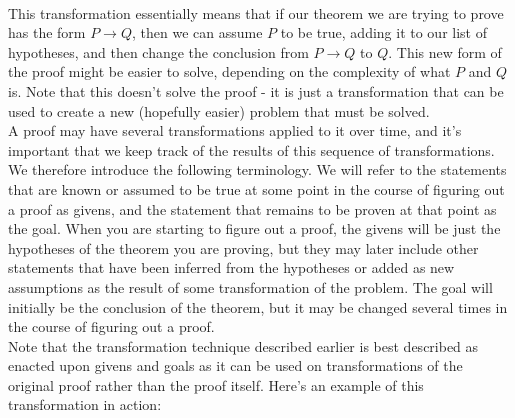 \documentclass{article}
\begin{document}
 \\
This transformation essentially means that if our theorem we are trying to prove has the form $P \rightarrow Q$, then we can assume $P$ to be true, adding it to our list of hypotheses, and then change the conclusion from $P \rightarrow Q$ to $Q$. This new form of the proof might be easier to solve, depending on the complexity of what $P$ and $Q$ is. Note that this doesn't solve the proof - it is just a transformation that can be used to create a new (hopefully easier) problem that must be solved.\\

\noindent A proof may have several transformations applied to it over time, and it's important that we keep track of the results of this sequence of transformations. We therefore introduce the following terminology. We will refer to the statements that are known or assumed to be true at some point in the course of figuring out a proof as \glspl{given}, and the statement that remains to be proven at that point as the \gls{goal}. When you are starting to figure out a proof, the givens will be just the hypotheses of the theorem you are proving, but they may later include other statements that have been inferred from the hypotheses or added as new assumptions as the result of some transformation of the problem. The goal will initially be the conclusion of the theorem, but it may be changed several times in the course of figuring out a proof.\\

\noindent Note that the transformation technique described earlier is best described as enacted upon givens and goals as it can be used on transformations of the original proof rather than the proof itself. Here's an example of this transformation in action:
\end{document}
